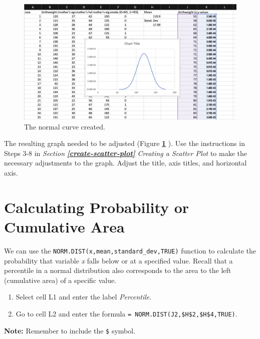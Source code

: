 \documentclass[
]{book}
\providecommand{\tightlist}{%
  \setlength{\itemsep}{0pt}\setlength{\parskip}{0pt}}
\begin{document}
\begin{figure}

{\centering \includegraphics[width=1\linewidth]{images/normal-curve} 

}

\caption{The normal curve created.}\label{fig:normal-curve}
\end{figure}

The resulting graph needed to be adjusted (Figure \textbf{\ref{fig:normal-curve}
}). Use the instructions in Steps 3-8 in \emph{Section} \textbf{\emph{\ref{create-scatter-plot}}} \emph{Creating a Scatter Plot} to make the necessary adjustments to the graph. Adjust the title, axis titles, and horizontal axis.

\hypertarget{calculating-probability-or-cumulative-area}{%
\section{Calculating Probability or Cumulative Area}\label{calculating-probability-or-cumulative-area}}

We can use the \texttt{NORM.DIST(x,mean,standard\_dev,TRUE)} function to calculate the probability that variable \emph{x} falls below or at a specified value. Recall that a percentile in a normal distribution also corresponds to the area to the left (cumulative area) of a specific value.

\begin{enumerate}
\def\labelenumi{\arabic{enumi}.}
\tightlist
\item
  Select cell L1 and enter the label \emph{Percentile}.
\item
  Go to cell L2 and enter the formula \texttt{=\ NORM.DIST(J2,\$H\$2,\$H\$4,TRUE)}.
\end{enumerate}

\textbf{Note:} Remember to include the \texttt{\$} symbol.
\end{document}
